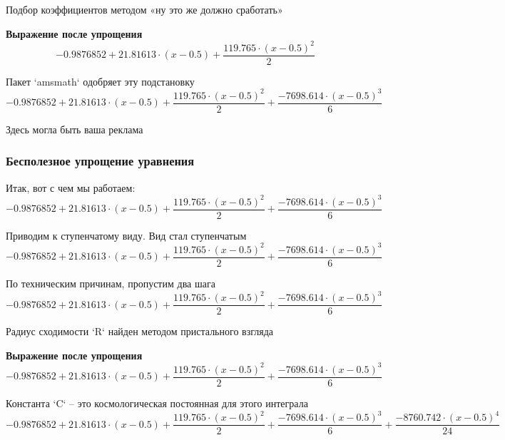 \documentclass{article}
\begin{document}
Подбор коэффициентов методом «ну это же должно сработать» 

\noindent\textbf{Выражение после упрощения}\\[4pt]
\begin{dmath*}
-0.9876852 + 21.81613 \cdot (x - 0.5) + \frac{119.765 \cdot (x - 0.5)^{2}}{2}
\end{dmath*}


Пакет `amsmath` одобряет эту подстановку 
\begin{dmath*}
-0.9876852 + 21.81613 \cdot (x - 0.5) + \frac{119.765 \cdot (x - 0.5)^{2}}{2} + \frac{-7698.614 \cdot (x - 0.5)^{3}}{6}
\end{dmath*}


Здесь могла быть ваша реклама 
\subsubsection*{Бесполезное упрощение уравнения}

Итак, вот с чем мы работаем:\\
\begin{dmath*}
-0.9876852 + 21.81613 \cdot (x - 0.5) + \frac{119.765 \cdot (x - 0.5)^{2}}{2} + \frac{-7698.614 \cdot (x - 0.5)^{3}}{6}
\end{dmath*}


Приводим к ступенчатому виду. Вид стал ступенчатым 
\begin{dmath*}
-0.9876852 + 21.81613 \cdot (x - 0.5) + \frac{119.765 \cdot (x - 0.5)^{2}}{2} + \frac{-7698.614 \cdot (x - 0.5)^{3}}{6}
\end{dmath*}


По техническим причинам, пропустим два шага 
\begin{dmath*}
-0.9876852 + 21.81613 \cdot (x - 0.5) + \frac{119.765 \cdot (x - 0.5)^{2}}{2} + \frac{-7698.614 \cdot (x - 0.5)^{3}}{6}
\end{dmath*}


Радиус сходимости `R` найден методом пристального взгляда 

\noindent\textbf{Выражение после упрощения}\\[4pt]
\begin{dmath*}
-0.9876852 + 21.81613 \cdot (x - 0.5) + \frac{119.765 \cdot (x - 0.5)^{2}}{2} + \frac{-7698.614 \cdot (x - 0.5)^{3}}{6}
\end{dmath*}


Константа `C` – это космологическая постоянная для этого интеграла 
\begin{dmath*}
-0.9876852 + 21.81613 \cdot (x - 0.5) + \frac{119.765 \cdot (x - 0.5)^{2}}{2} + \frac{-7698.614 \cdot (x - 0.5)^{3}}{6} + \frac{-8760.742 \cdot (x - 0.5)^{4}}{24}
\end{dmath*}
\end{document}
